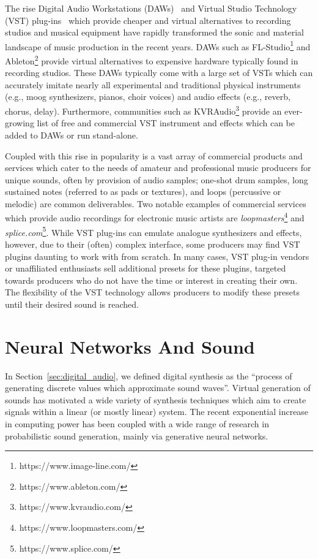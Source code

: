 \documentclass[\main/thesis.tex]{subfiles}
\begin{document}
 The rise Digital Audio Workstations (DAWs)~\cite{leider2004digital} and Virtual Studio Technology (VST) plug-ins~\cite{tanev2013virtual} which provide cheaper and virtual alternatives to recording studios and musical equipment have rapidly transformed the sonic and material landscape of music production in the recent years. DAWs such as FL-Studio\footnote{https://www.image-line.com/} and Ableton\footnote{https://www.ableton.com/} provide virtual alternatives to expensive hardware typically found in recording studios. These DAWs typically come with a large set of VSTs which can accurately imitate nearly all experimental and traditional physical instruments (e.g., moog synthesizers, pianos, choir voices) and audio effects (e.g., reverb, chorus, delay). Furthermore, communities such as KVRAudio\footnote{https://www.kvraudio.com/} provide an ever-growing list of free and commercial VST instrument and effects which can be added to DAWs or run stand-alone.
 
 Coupled with this rise in popularity is a vast array of commercial products and services which cater to the needs of amateur and professional music producers for unique sounds, often by provision of audio samples; one-shot drum samples, long sustained notes (referred to as pads or textures), and loops (percussive or melodic) are common deliverables. Two notable examples of commercial services which provide audio recordings for electronic music artists are \textit{loopmasters}\footnote{https://www.loopmasters.com/} and \textit{splice.com}\footnote{https://www.splice.com/}. While VST plug-ins can emulate analogue synthesizers and effects,  however,  due to their (often) complex interface, some producers may find VST plugins daunting to work with from scratch. In many cases, VST plug-in vendors or unaffiliated enthusiasts sell additional presets for these plugins, targeted towards producers who do not have the time or interest in creating their own. The flexibility of the VST technology allows producers to modify these presets until their desired sound is reached.
 
\section{Neural Networks And Sound}
\label{bg:NN}
In Section~\ref{sec:digital_audio}, we defined digital synthesis as the \enquote{process of generating discrete values which approximate sound waves}. Virtual generation of sounds has motivated a wide variety of synthesis techniques which aim to create signals within a linear (or mostly linear) system. The recent exponential increase in computing power has been coupled with a wide range of research in probabilistic sound generation, mainly via generative neural networks. 
\end{document}
